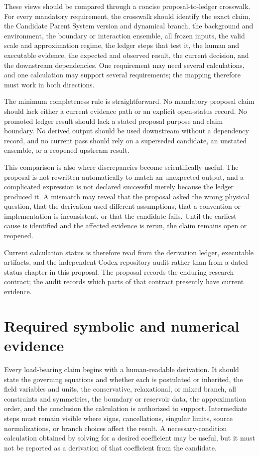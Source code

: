 These views should be compared through a concise proposal-to-ledger crosswalk.
For every mandatory requirement, the crosswalk should identify the exact claim,
the Candidate Parent System version and dynamical branch, the background and
environment, the boundary or interaction ensemble, all frozen inputs, the valid
scale and approximation regime, the ledger steps that test it, the human and
executable evidence, the expected and observed result, the current decision,
and the downstream dependencies. One requirement may need several calculations,
and one calculation may support several requirements; the mapping therefore
must work in both directions.

The minimum completeness rule is straightforward. No mandatory proposal claim
should lack either a current evidence path or an explicit open-status record.
No promoted ledger result should lack a stated proposal purpose and claim
boundary. No derived output should be used downstream without a dependency
record, and no current pass should rely on a superseded candidate, an unstated
ensemble, or a reopened upstream result.

This comparison is also where discrepancies become scientifically useful. The
proposal is not rewritten automatically to match an unexpected output, and a
complicated expression is not declared successful merely because the ledger
produced it. A mismatch may reveal that the proposal asked the wrong physical
question, that the derivation used different assumptions, that a convention or
implementation is inconsistent, or that the candidate fails. Until the earliest
cause is identified and the affected evidence is rerun, the claim remains open
or reopened.

Current calculation status is therefore read from the derivation ledger,
executable artifacts, and the independent Codex repository audit rather than from a
dated status chapter in this proposal. The proposal records the enduring
research contract; the audit records which parts of that contract presently
have current evidence.

\section{Required symbolic and numerical evidence}

Every load-bearing claim begins with a human-readable derivation. It should state
the governing equations and whether each is postulated or inherited, the field
variables and units, the conservative, relaxational, or mixed branch, all
constraints and symmetries, the boundary or reservoir data, the approximation
order, and the conclusion the calculation is authorized to support. Intermediate
steps must remain visible where signs, cancellations, singular limits, source
normalizations, or branch choices affect the result. A necessary-condition
calculation obtained by solving for a desired coefficient may be useful, but it
must not be reported as a derivation of that coefficient from the candidate.

